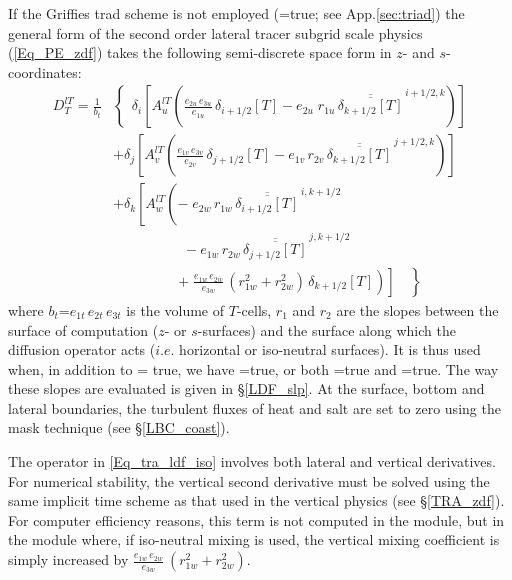 If the Griffies trad scheme is not employed
(=true; see App.\ref{sec:triad}) the general form of the second order lateral tracer subgrid scale physics 
(\ref{Eq_PE_zdf}) takes the following semi-discrete space form in $z$- and 
$s$-coordinates:
\begin{equation} \label{Eq_tra_ldf_iso}
\begin{split}
 D_T^{lT} = \frac{1}{b_t}   & \left\{   \,\;\delta_i \left[   A_u^{lT}  \left( 
	  \frac{e_{2u}\,e_{3u}}{e_{1u}} \,\delta_{i+1/2}[T]
	- e_{2u}\;r_{1u} \,\overline{\overline{ \delta_{k+1/2}[T] }}^{\,i+1/2,k}
                                                     \right)   \right]   \right.    \\ 
&             +\delta_j \left[ A_v^{lT} \left( 
          \frac{e_{1v}\,e_{3v}}{e_{2v}}  \,\delta_{j+1/2} [T] 
        - e_{1v}\,r_{2v} \,\overline{\overline{ \delta_{k+1/2} [T] }}^{\,j+1/2,k} 
                                                    \right)   \right]                 \\ 
& +\delta_k \left[ A_w^{lT} \left( 
       -\;e_{2w}\,r_{1w} \,\overline{\overline{ \delta_{i+1/2} [T] }}^{\,i,k+1/2}
                                                    \right.   \right.                 \\ 
& \qquad \qquad \quad 
        - e_{1w}\,r_{2w} \,\overline{\overline{ \delta_{j+1/2} [T] }}^{\,j,k+1/2}     \\
& \left. {\left. {   \qquad \qquad \ \ \ \left. {
        +\;\frac{e_{1w}\,e_{2w}}{e_{3w}} \,\left( r_{1w}^2 + r_{2w}^2 \right)
           \,\delta_{k+1/2} [T] } \right) } \right] \quad } \right\} 
 \end{split}
 \end{equation}
where $b_t$=$e_{1t}\,e_{2t}\,e_{3t}$  is the volume of $T$-cells, 
$r_1$ and $r_2$ are the slopes between the surface of computation 
($z$- or $s$-surfaces) and the surface along which the diffusion operator 
acts ($i.e.$ horizontal or iso-neutral surfaces).  It is thus used when, 
in addition to = true, we have =true, 
or both =true and =true. The way these 
slopes are evaluated is given in \S\ref{LDF_slp}. At the surface, bottom 
and lateral boundaries, the turbulent fluxes of heat and salt are set to zero 
using the mask technique (see \S\ref{LBC_coast}). 

The operator in \eqref{Eq_tra_ldf_iso} involves both lateral and vertical 
derivatives. For numerical stability, the vertical second derivative must 
be solved using the same implicit time scheme as that used in the vertical 
physics (see \S\ref{TRA_zdf}). For computer efficiency reasons, this term 
is not computed in the  module, but in the  module 
where, if iso-neutral mixing is used, the vertical mixing coefficient is simply 
increased by $\frac{e_{1w}\,e_{2w} }{e_{3w} }\ \left( {r_{1w} ^2+r_{2w} ^2} \right)$. 


